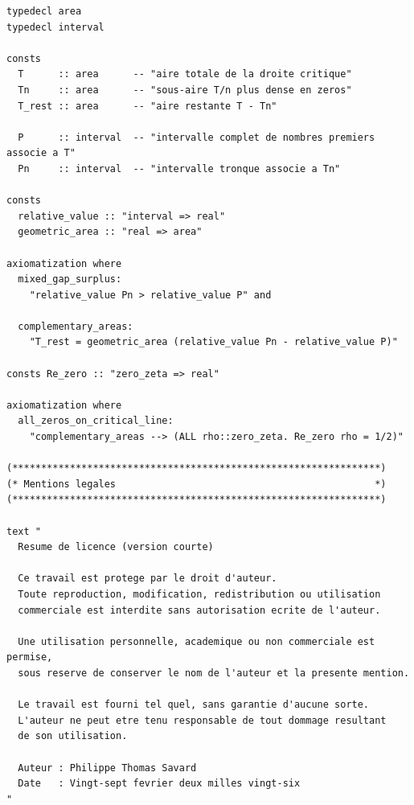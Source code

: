 \documentclass[a4paper,11pt]{article}
\begin{document}
\begin{holcode}[title={\textcolor{white}{Fichier : methode\_spectral.thy -- Partie 6/6 (FIN)}}]
\begin{lstlisting}
typedecl area
typedecl interval

consts
  T      :: area      -- "aire totale de la droite critique"
  Tn     :: area      -- "sous-aire T/n plus dense en zeros"
  T_rest :: area      -- "aire restante T - Tn"

  P      :: interval  -- "intervalle complet de nombres premiers associe a T"
  Pn     :: interval  -- "intervalle tronque associe a Tn"

consts
  relative_value :: "interval => real"
  geometric_area :: "real => area"

axiomatization where
  mixed_gap_surplus:
    "relative_value Pn > relative_value P" and

  complementary_areas:
    "T_rest = geometric_area (relative_value Pn - relative_value P)"

consts Re_zero :: "zero_zeta => real"

axiomatization where
  all_zeros_on_critical_line:
    "complementary_areas --> (ALL rho::zero_zeta. Re_zero rho = 1/2)"

(****************************************************************)
(* Mentions legales                                             *)
(****************************************************************)

text "
  Resume de licence (version courte)

  Ce travail est protege par le droit d'auteur.
  Toute reproduction, modification, redistribution ou utilisation
  commerciale est interdite sans autorisation ecrite de l'auteur.

  Une utilisation personnelle, academique ou non commerciale est permise,
  sous reserve de conserver le nom de l'auteur et la presente mention.

  Le travail est fourni tel quel, sans garantie d'aucune sorte.
  L'auteur ne peut etre tenu responsable de tout dommage resultant
  de son utilisation.

  Auteur : Philippe Thomas Savard
  Date   : Vingt-sept fevrier deux milles vingt-six
"
\end{lstlisting}
\end{holcode}

\end{document}

